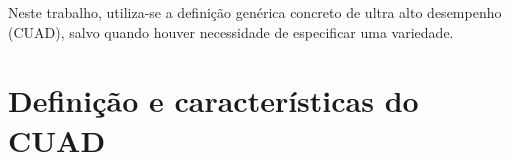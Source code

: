 Neste trabalho, utiliza-se a definição genérica concreto de ultra alto desempenho (CUAD), salvo quando houver necessidade de especificar uma variedade.

\section{Definição e características do CUAD}

%
%
%
%

